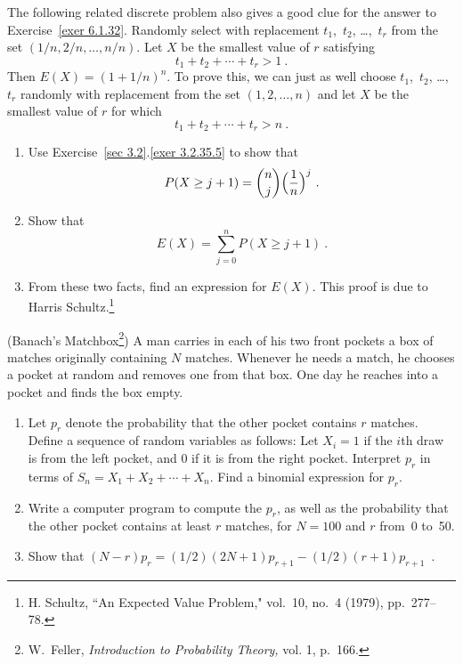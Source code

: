 \begin{LJSItem}
\istar\label{exer 6.1.33} The following related discrete problem also gives a good
clue for the answer to Exercise~\ref{exer 6.1.32}.  Randomly select with replacement
$t_1$,~$t_2$,
\dots,~$t_r$ from the set $(1/n, 2/n, \dots, n/n)$.  Let $X$ be the smallest value of
$r$ satisfying
$$ t_1 + t_2 +\cdots+ t_r > 1\ .
$$ Then $E(X) = (1 + 1/n)^n$.  To prove this, we can just as well choose
$t_1$,~$t_2$, \dots,~$t_r$ randomly with replacement from the set $(1, 2,
\dots, n)$ and let $X$ be the smallest value of $r$ for which
$$ t_1 + t_2 +\cdots+ t_r > n\ .
$$
\begin{enumerate}
\item Use Exercise~\ref{sec 3.2}.\ref{exer 3.2.35.5} to show that
$$ P(X \geq j + 1) = {n \choose j}{\Bigl(\frac {1}{n}\Bigr)^j}\ .
$$
\item Show that
$$ E(X) = \sum_{j = 0}^n P(X \geq j + 1)\ .
$$
\item From these two facts, find an expression for $E(X)$.  This proof is due to
Harris Schultz.\footnote{H. Schultz, ``An Expected Value Problem,"  vol.~10, no.~4 (1979), pp.~277--78.}
\end{enumerate}

\istar\label{exer 6.1.34} (Banach's Matchbox\footnote{W.~Feller, {\em
Introduction to Probability Theory,} vol. 1, p.~166.}) A man carries in each of his two front
pockets a box of matches originally containing $N$ matches.  Whenever he needs a match, he chooses
a pocket at random and removes one from that box.  One day he reaches into a pocket
and finds the box empty.

\begin{enumerate}
\item Let $p_r$ denote the probability that the other pocket contains $r$ matches. 
Define a sequence of   random variables as follows: Let
$X_i = 1$ if the $i$th draw is from the left pocket, and 0 if it is from the right
pocket.  Interpret $p_r$ in terms of $S_n = X_1 + X_2 +\cdots+ X_n$.  Find a binomial
expression for $p_r$.

\item Write a computer program to compute the $p_r$, as well as the probability that
the other pocket contains at least $r$ matches, for $N = 100$ and $r$ from~0 to~50.

\item Show that $(N - r)p_r = (1/2)(2N + 1)p_{r + 1} - (1/2)(r + 1)p_{r + 1}$\ .


\end{enumerate}
\end{LJSItem}
